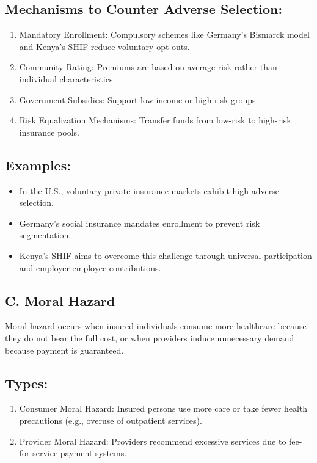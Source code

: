 \documentclass[10pt]{article}
\begin{document}
\subsection*{Mechanisms to Counter Adverse Selection:}
\begin{enumerate}
  \item Mandatory Enrollment: Compulsory schemes like Germany's Bismarck model and Kenya's SHIF reduce voluntary opt-outs.
  \item Community Rating: Premiums are based on average risk rather than individual characteristics.
  \item Government Subsidies: Support low-income or high-risk groups.
  \item Risk Equalization Mechanisms: Transfer funds from low-risk to high-risk insurance pools.
\end{enumerate}

\subsection*{Examples:}
\begin{itemize}
  \item In the U.S., voluntary private insurance markets exhibit high adverse selection.
  \item Germany's social insurance mandates enrollment to prevent risk segmentation.
  \item Kenya's SHIF aims to overcome this challenge through universal participation and employer-employee contributions.
\end{itemize}

\subsection*{C. Moral Hazard}
\begin{definition}
	Moral hazard occurs when insured individuals consume more healthcare because they do not bear the full cost, or when providers induce unnecessary demand because payment is guaranteed.
\end{definition}


\subsection*{Types:}
\begin{enumerate}
  \item Consumer Moral Hazard: Insured persons use more care or take fewer health precautions (e.g., overuse of outpatient services).
  \item Provider Moral Hazard: Providers recommend excessive services due to fee-for-service payment systems.
\end{enumerate}
\end{document}
